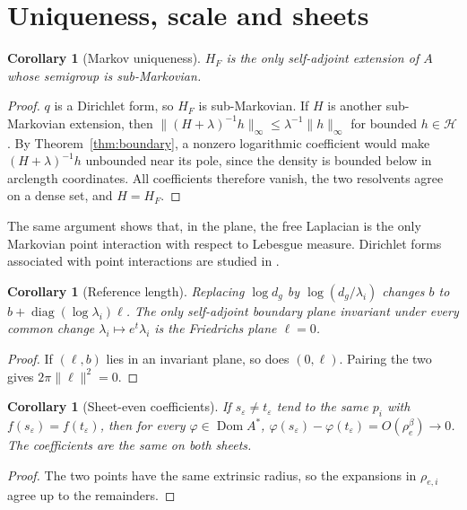 \documentclass[11pt]{article}
\newtheorem{corollary}[theorem]{Corollary}
\theoremstyle{definition}\newtheorem{definition}[theorem]{Definition}
\theoremstyle{remark}\newtheorem{remark}[theorem]{Remark}
\newcommand{\Dom}{\operatorname{Dom}}\newcommand{\dd}{\,d}
\newcommand{\norm}[1]{\lVert#1\rVert}
\newcommand{\cH}{\mathcal H}\newcommand{\cV}{\mathcal V}\newcommand{\inte}{\operatorname{int}}
\begin{document}
\section{Uniqueness, scale and sheets}\label{sec:uniqueness}
\begin{corollary}[Markov uniqueness]\label{cor:markov}
$H_F$ is the only self-adjoint extension of $A$ whose semigroup is
sub-Markovian.
\end{corollary}
\begin{proof}
$q$ is a Dirichlet form, so $H_F$ is sub-Markovian. If $H$ is another
sub-Markovian extension, then $\norm{(H+\lambda)^{-1}h}_\infty\leq\lambda^{-1}\norm h_\infty$
for bounded $h\in\cH$. By Theorem~\ref{thm:boundary}, a nonzero logarithmic
coefficient would make $(H+\lambda)^{-1}h$ unbounded near its pole, since the
density is bounded below in arclength coordinates. All coefficients therefore
vanish, the two resolvents agree on a dense set, and $H=H_F$.
\end{proof}
The same argument shows that, in the plane, the free Laplacian is the only
Markovian point interaction with respect to Lebesgue measure. Dirichlet forms
associated with point interactions are studied in \cite{abr}.

\begin{corollary}[Reference length]\label{cor:scale}
Replacing $\log d_g$ by $\log(d_g/\lambda_i)$ changes $b$ to
$b+\operatorname{diag}(\log\lambda_i)\ell$. The only self-adjoint boundary plane
invariant under every common change $\lambda_i\mapsto e^t\lambda_i$ is the
Friedrichs plane $\ell=0$.
\end{corollary}
\begin{proof}
If $(\ell,b)$ lies in an invariant plane, so does $(0,\ell)$. Pairing the two
gives $2\pi\norm\ell^2=0$.
\end{proof}

\begin{corollary}[Sheet-even coefficients]\label{cor:sheets}
If $s_\varepsilon\neq t_\varepsilon$ tend to the same $p_i$ with
$f(s_\varepsilon)=f(t_\varepsilon)$, then for every $\varphi\in\Dom A^*$,
$\varphi(s_\varepsilon)-\varphi(t_\varepsilon)=O(\rho_e^\beta)\to0$. The coefficients
are the same on both sheets.
\end{corollary}
\begin{proof}
The two points have the same extrinsic radius, so the expansions in
$\rho_{e,i}$ agree up to the remainders.
\end{proof}
\end{document}
